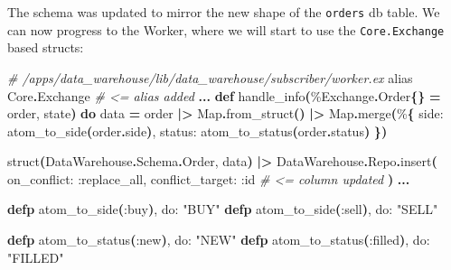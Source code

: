 \documentclass[
  oneside]{book}
\newenvironment{Shaded}{\begin{snugshade}}{\end{snugshade}}
\newcommand{\CommentTok}[1]{\textcolor[rgb]{0.56,0.35,0.01}{\textit{#1}}}
\newcommand{\ConstantTok}[1]{\textcolor[rgb]{0.56,0.35,0.01}{#1}}
\newcommand{\FunctionTok}[1]{\textcolor[rgb]{0.13,0.29,0.53}{\textbf{#1}}}
\newcommand{\ImportTok}[1]{#1}
\newcommand{\KeywordTok}[1]{\textcolor[rgb]{0.13,0.29,0.53}{\textbf{#1}}}
\newcommand{\NormalTok}[1]{#1}
\newcommand{\OperatorTok}[1]{\textcolor[rgb]{0.81,0.36,0.00}{\textbf{#1}}}
\newcommand{\StringTok}[1]{\textcolor[rgb]{0.31,0.60,0.02}{#1}}
\newcommand{\VariableTok}[1]{\textcolor[rgb]{0.00,0.00,0.00}{#1}}
\begin{document}
The schema was updated to mirror the new shape of the \texttt{orders} db table.
We can now progress to the Worker, where we will start to use the \texttt{Core.Exchange} based structs:

\begin{Shaded}
\begin{Highlighting}[]
  \CommentTok{\# /apps/data\_warehouse/lib/data\_warehouse/subscriber/worker.ex}
  \ImportTok{alias} \ConstantTok{Core}\OperatorTok{.}\ConstantTok{Exchange} \CommentTok{\# \textless{}= alias added}
  \OperatorTok{...}
  \KeywordTok{def}\NormalTok{ handle\_info}\FunctionTok{(}\NormalTok{\%}\ConstantTok{Exchange}\OperatorTok{.}\ConstantTok{Order}\FunctionTok{\{\}} \OperatorTok{=}\NormalTok{ order, state}\FunctionTok{)} \KeywordTok{do}
\NormalTok{    data }\OperatorTok{=}
\NormalTok{      order}
      \OperatorTok{|\textgreater{}} \ConstantTok{Map}\OperatorTok{.}\NormalTok{from\_struct}\FunctionTok{()}
      \OperatorTok{|\textgreater{}} \ConstantTok{Map}\OperatorTok{.}\NormalTok{merge}\FunctionTok{(}\NormalTok{\%}\FunctionTok{\{}
        \VariableTok{side:}\NormalTok{ atom\_to\_side}\FunctionTok{(}\NormalTok{order}\OperatorTok{.}\NormalTok{side}\FunctionTok{)}\NormalTok{,}
        \VariableTok{status:}\NormalTok{ atom\_to\_status}\FunctionTok{(}\NormalTok{order}\OperatorTok{.}\NormalTok{status}\FunctionTok{)}
      \FunctionTok{\})}

\NormalTok{    struct}\FunctionTok{(}\ConstantTok{DataWarehouse}\OperatorTok{.}\ConstantTok{Schema}\OperatorTok{.}\ConstantTok{Order}\NormalTok{, data}\FunctionTok{)}
    \OperatorTok{|\textgreater{}} \ConstantTok{DataWarehouse}\OperatorTok{.}\ConstantTok{Repo}\OperatorTok{.}\NormalTok{insert}\FunctionTok{(}
      \VariableTok{on\_conflict:} \VariableTok{:replace\_all}\NormalTok{,}
      \VariableTok{conflict\_target:} \VariableTok{:id} \CommentTok{\# \textless{}= column updated}
    \FunctionTok{)}
    \OperatorTok{...}

  \KeywordTok{defp}\NormalTok{ atom\_to\_side}\FunctionTok{(}\VariableTok{:buy}\FunctionTok{)}\NormalTok{, }\VariableTok{do:} \StringTok{"BUY"}
  \KeywordTok{defp}\NormalTok{ atom\_to\_side}\FunctionTok{(}\VariableTok{:sell}\FunctionTok{)}\NormalTok{, }\VariableTok{do:} \StringTok{"SELL"}

  \KeywordTok{defp}\NormalTok{ atom\_to\_status}\FunctionTok{(}\VariableTok{:new}\FunctionTok{)}\NormalTok{, }\VariableTok{do:} \StringTok{"NEW"}
  \KeywordTok{defp}\NormalTok{ atom\_to\_status}\FunctionTok{(}\VariableTok{:filled}\FunctionTok{)}\NormalTok{, }\VariableTok{do:} \StringTok{"FILLED"}
\end{Highlighting}
\end{Shaded}
\end{document}
